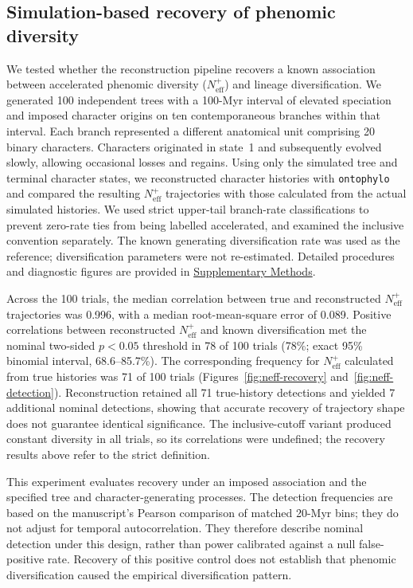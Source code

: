 \subsection*{Simulation-based recovery of phenomic diversity}
\label{sec:neff-main}

We tested whether the reconstruction pipeline recovers a known association
between accelerated phenomic diversity ($N_{\mathrm{eff}}^{+}$) and lineage
diversification. We generated 100 independent trees with a 100-Myr interval
of elevated speciation and imposed character origins on ten contemporaneous
branches within that interval. Each branch represented a different anatomical
unit comprising 20 binary characters. Characters originated in state~1 and
subsequently evolved slowly, allowing occasional losses and regains.
Using only the simulated tree and terminal character states, we reconstructed
character histories with \texttt{ontophylo} and compared the resulting
$N_{\mathrm{eff}}^{+}$ trajectories with those calculated from the actual
simulated histories. We used strict upper-tail branch-rate classifications
to prevent zero-rate ties from being labelled accelerated, and examined the
inclusive convention separately. The known generating diversification rate was used as
the reference; diversification parameters were not re-estimated.
Detailed procedures and diagnostic figures are provided in
\hyperref[sec:neff-supplement]{Supplementary Methods}.

Across the 100 trials, the median correlation between true and reconstructed
$N_{\mathrm{eff}}^{+}$ trajectories was 0.996, with a median
root-mean-square error of 0.089.
Positive correlations between reconstructed $N_{\mathrm{eff}}^{+}$ and
known diversification met the nominal two-sided $p<0.05$ threshold in
78 of 100 trials (78\%; exact 95\%
binomial interval, 68.6--85.7\%).
The corresponding frequency for $N_{\mathrm{eff}}^{+}$ calculated from
true histories was 71 of 100 trials
(Figures~\ref{fig:neff-recovery} and~\ref{fig:neff-detection}).
Reconstruction retained all 71 true-history detections and yielded 7
additional nominal detections, showing that accurate recovery of trajectory
shape does not guarantee identical significance. The inclusive-cutoff
variant produced constant diversity in all trials, so its correlations
were undefined; the recovery results above refer to the strict definition.

This experiment evaluates recovery under an imposed association and the
specified tree and character-generating processes. The detection frequencies
are based on the manuscript's Pearson comparison of matched 20-Myr bins;
they do not adjust for temporal autocorrelation. They therefore describe
nominal detection under this design, rather than power calibrated against a
null false-positive rate. Recovery of this positive control does not establish
that phenomic diversification caused the empirical diversification pattern.

